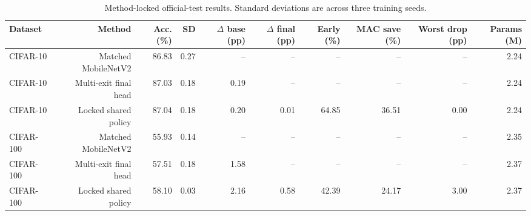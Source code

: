 \begin{table}[t]
\centering
\small
\caption{Method-locked official-test results. Standard deviations are across three training seeds.}
\label{tab:main-results}
\begin{tabular}{lrrrrrrrrr}
\toprule
Dataset & Method & Acc. (\%) & SD & $\Delta$ base (pp) & $\Delta$ final (pp) & Early (\%) & MAC save (\%) & Worst drop (pp) & Params (M) \\
\midrule
CIFAR-10 & Matched MobileNetV2 & 86.83 & 0.27 & -- & -- & -- & -- & -- & 2.24 \\
CIFAR-10 & Multi-exit final head & 87.03 & 0.18 & 0.19 & -- & -- & -- & -- & 2.24 \\
CIFAR-10 & Locked shared policy & 87.04 & 0.18 & 0.20 & 0.01 & 64.85 & 36.51 & 0.00 & 2.24 \\
CIFAR-100 & Matched MobileNetV2 & 55.93 & 0.14 & -- & -- & -- & -- & -- & 2.35 \\
CIFAR-100 & Multi-exit final head & 57.51 & 0.18 & 1.58 & -- & -- & -- & -- & 2.37 \\
CIFAR-100 & Locked shared policy & 58.10 & 0.03 & 2.16 & 0.58 & 42.39 & 24.17 & 3.00 & 2.37 \\
\bottomrule
\end{tabular}
\end{table}

